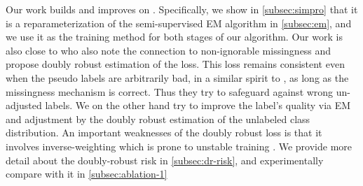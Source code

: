 Our work builds and improves on \cite{simpro}. Specifically, we show in \cref{subsec:simpro} that it is a reparameterization of the semi-supervised EM algorithm in \cref{subsec:em}, and we use it as the training method for both stages of our algorithm.
Our work is also close to \cite{arelabelsinformative, onnonrandommissinglabels} who also note the connection to non-ignorable missingness and propose doubly robust estimation of the loss.
This loss remains consistent even when the pseudo labels are arbitrarily bad, in a similar spirit to \cite{schmutz-drloss, drst}, as long as the missingness mechanism is correct. Thus they try to safeguard against wrong un-adjusted labels. We on the other hand try to improve the label's quality via EM and adjustment by the doubly robust estimation of the unlabeled class distribution.
An important weaknesses of the doubly robust loss \cite{arelabelsinformative} is that it involves inverse-weighting \cite{cui-effective} which is prone to unstable training \cite{balanced-meta-softmax}. We provide more detail about the doubly-robust risk in \cref{subsec:dr-risk}, and experimentally compare with it in \cref{subsec:ablation-1}